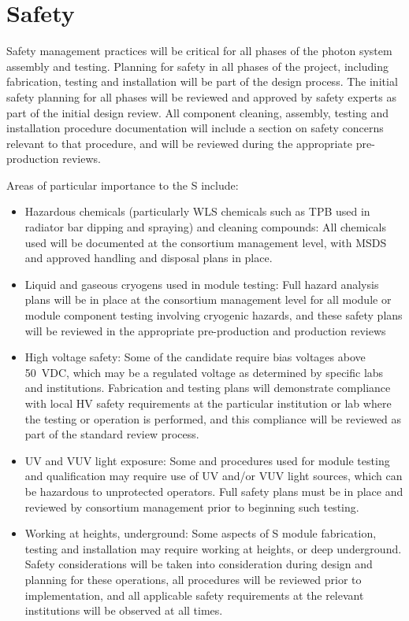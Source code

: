 \section{Safety}
\label{sec:fdsp-pd-safety}

Safety management practices will be critical for all phases of the photon system assembly and testing.  Planning for safety in all phases of the project, including fabrication, testing and installation will be part of the design process.  The initial safety planning for all phases will be reviewed and approved by safety experts as part of the initial design review.  All component cleaning, assembly, testing  and installation procedure documentation will include a section on safety concerns relevant to that procedure, and will be reviewed during the appropriate pre-production reviews.

Areas of particular importance to the S include:
\begin{itemize}
\item Hazardous chemicals (particularly WLS chemicals such as TPB used in radiator bar dipping and spraying) and cleaning compounds:  All chemicals used will be documented at the consortium management level, with MSDS and approved handling and disposal plans in place.

\item Liquid and gaseous cryogens used in module testing:  Full hazard analysis plans will be in place at the consortium management level for all module or module component testing involving cryogenic hazards, and these safety plans will be reviewed in the appropriate pre-production and production reviews

\item High voltage safety:  Some of the candidate  require bias voltages above \SI{50}{VDC}, which may be a regulated voltage as determined by specific labs and institutions.  Fabrication and testing plans will demonstrate compliance with local HV safety requirements at the particular institution or lab where the testing or operation is performed, and this compliance will be reviewed as part of the standard review process.

\item UV and VUV light exposure:  Some  and  procedures used for module testing and qualification may require use of UV and/or VUV light sources, which can be hazardous  to unprotected operators.  Full safety plans must be in place and reviewed by consortium management prior to beginning such testing.

\item Working at heights, underground:  Some aspects of S module fabrication, testing and installation may require working at heights, or deep underground.  Safety considerations will be taken into consideration during design and planning for these operations, all procedures will be reviewed prior to implementation, and all applicable safety requirements at the relevant institutions will be observed at all times.

\end{itemize}
